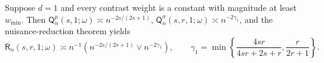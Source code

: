 Suppose \(d=1\) and every contrast weight is a constant with magnitude at least \(w_{\min}\). Then \(\mathsf Q_n^{\mu}(s,1;\omega)\asymp n^{-2s/(2s+1)}\), \(\mathsf Q_n^{\sigma}(s,r,1;\omega)\asymp n^{-2\gamma_1}\), and the nuisance-reduction theorem yields \[\mathsf R_n(s,r,1;\omega)\asymp n^{-1}\left(n^{-2s/(2s+1)}\vee n^{-2\gamma_1}\right),\qquad \gamma_1=\min\left\{\frac{4sr}{4sr+2s+r},\frac{r}{2r+1}\right\}.\]